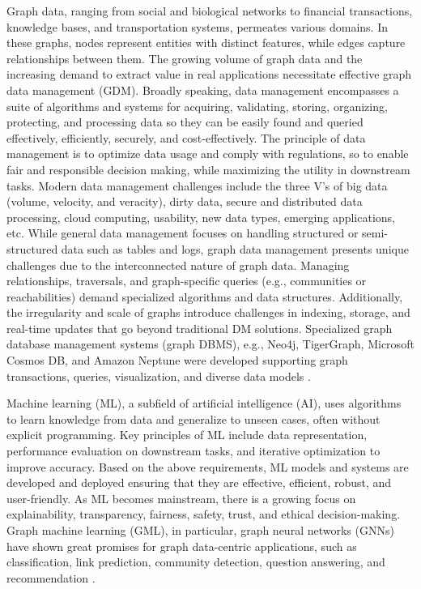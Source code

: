 \documentclass{sig-alternate-10pt}
\begin{document}
\medskip
\medskip

Graph data, ranging from social and biological networks to financial transactions, knowledge bases, and transportation systems,
permeates various domains. In these graphs, nodes represent entities with distinct features, while edges capture relationships between them.
The growing volume of graph data and the increasing demand to extract value in real applications necessitate effective graph data management (GDM).
Broadly speaking, data management encompasses a suite of algorithms and systems for acquiring, validating, storing, organizing, protecting, and processing data so they can be easily found and queried effectively, efficiently, securely, and cost-effectively.
The principle of data management is to optimize data usage and comply with regulations, so to enable fair and responsible decision making, while maximizing the utility in downstream tasks.
Modern data management challenges include the three V's of big data (volume, velocity, and veracity), dirty data, secure and distributed data processing, cloud computing, usability, new data types, emerging applications, etc.
While general data management focuses on handling structured or semi-structured data such as tables and logs, graph data management presents unique challenges due to the interconnected nature of graph data.
Managing relationships, traversals, and graph-specific queries (e.g., communities or reachabilities) demand specialized algorithms and data structures. Additionally, the irregularity and scale of graphs introduce challenges in indexing, storage, and real-time updates that go beyond traditional DM solutions.
Specialized graph database management systems (graph DBMS), e.g., Neo4j, TigerGraph, Microsoft Cosmos DB, and Amazon Neptune were developed supporting graph transactions, queries, visualization, and diverse data models \cite{Tian22}.


Machine learning (ML), a subfield of artificial intelligence (AI), uses algorithms to learn knowledge from data and generalize to unseen cases, often without explicit programming.
Key principles of ML include data representation, performance evaluation on downstream tasks, and iterative optimization to improve accuracy.
Based on the above requirements, ML models and systems are developed and deployed ensuring that they are effective, efficient, robust, and user-friendly.
As ML becomes mainstream, there is a growing focus on explainability, transparency, fairness, safety, trust,  and ethical decision-making.
Graph machine learning (GML), in particular, graph neural networks (GNNs) have shown great promises for graph data-centric applications, such as classification, link prediction, community detection, question answering, and recommendation \cite{wu2020comprehensive}.
\end{document}
